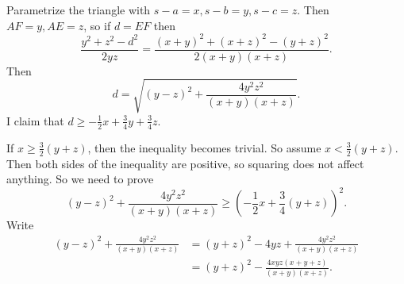 Parametrize the triangle with $s-a=x,s-b=y,s-c=z$. Then $AF=y,AE=z$, so if $d=EF$ then \[\frac{y^2+z^2-d^2}{2yz}=\frac{\left(x+y\right)^2+\left(x+z\right)^2-\left(y+z\right)^2}{2\left(x+y\right)\left(x+z\right)}.\] Then \[d=\sqrt{\left(y-z\right)^2+\frac{4y^2z^2}{\left(x+y\right)\left(x+z\right)}}.\] I claim that $d\geq-\frac{1}{2}x+\frac{3}{4}y+\frac{3}{4}z$.

If $x\geq\frac{3}{2}\left(y+z\right)$, then the inequality becomes trivial. So assume $x<\frac{3}{2}\left(y+z\right)$. Then both sides of the inequality are positive, so squaring does not affect anything. So we need to prove \[\left(y-z\right)^2+\frac{4y^2z^2}{\left(x+y\right)\left(x+z\right)}\geq\left(-\frac{1}{2}x+\frac{3}{4}\left(y+z\right)\right)^2.\] Write
\begin{align*}
	\left(y-z\right)^2+\frac{4y^2z^2}{\left(x+y\right)\left(x+z\right)}&=\left(y+z\right)^2-4yz+\frac{4y^2z^2}{\left(x+y\right)\left(x+z\right)}\\
	&=\left(y+z\right)^2-\frac{4xyz\left(x+y+z\right)}{\left(x+y\right)\left(x+z\right)}.
\end{align*}
